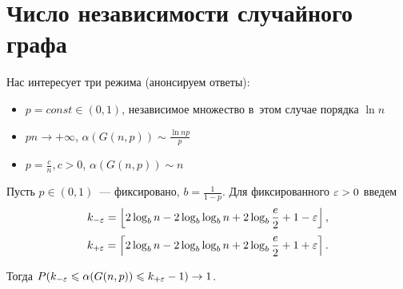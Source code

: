 \documentclass{article}
\begin{document}
\section{Число независимости случайного графа}

Нас интересует три режима (анонсируем ответы):
\begin{itemize}
	\item $p = const \in (0, 1)$, независимое множество в~этом случае порядка $\ln n$
	\item $pn \rightarrow +\infty$, $\alpha(G(n,p)) \sim \frac{\ln np}{p}$
	\item $p = \frac{c}{n}, c > 0$, $\alpha(G(n,p)) \sim n$
\end{itemize}

\begin{theorem}
	Пусть $p \in (0, 1)$~--- фиксировано, $b = \frac{1}{1 - p}$. Для фиксированного $\varepsilon > 0$ введем
	$$k_{-\varepsilon} = \left\lfloor 2\log_b n - 2\log_b\log_b n + 2 \log_b \frac{e}{2} + 1 - \varepsilon
	\right\rfloor,$$
	$$k_{+\varepsilon} = \left\lceil 2\log_b n - 2\log_b\log_b n + 2 \log_b \frac{e}{2} + 1 + \varepsilon
	\right\rceil.$$

	Тогда $P(k_{-\varepsilon} \leqslant \alpha(G(n,p)) \leqslant k_{+\varepsilon} - 1) \rightarrow 1$.
\end{theorem}
\end{document}
